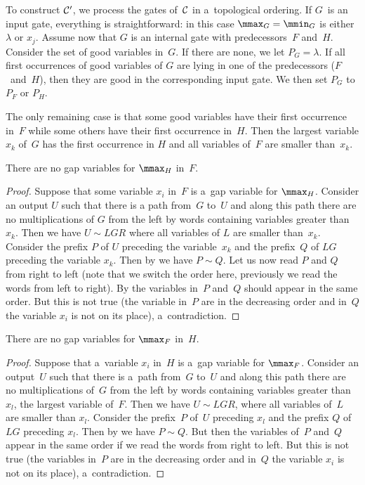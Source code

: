 To construct ${\cal C}'$, we process the gates of~${\cal C}$ in a~topological ordering. If $G$~is an input gate, everything is straightforward: in this case $\mmax_G=\mmin_G$ is either $\lambda$ or $x_j$. Assume now that $G$ is an internal gate with predecessors~$F$ and~$H$.
Consider the set of good variables in~$G$. If there are none, we let $P_G=\lambda$. If all first occurrences of good variables of $G$ are lying in one of the predecessors ($F$~and~$H$), then they are good in the corresponding input gate. We then set $P_G$ to $P_F$ or $P_H$.

The only remaining case is that some good variables have their first occurrence in~$F$ while some others have their first occurrence in~$H$. Then the largest variable $x_k$ of~$G$ has the first occurrence in $H$ and all variables of~$F$ are smaller than~$x_k$.

\begin{claim} \label{cl: h is good}
    There are no gap variables for $\mmax_H$ in~$F$.
\end{claim}

\begin{proof}
    Suppose that some variable $x_i$ in~$F$ is a~gap variable for $\mmax_H$. Consider an output $U$ such that there is a path from~$G$ to~$U$ and along this path there are no multiplications of $G$ from the left by words containing variables greater than~$x_k$. Then we have $U \sim LGR$ where all variables of $L$ are smaller than~$x_k$. Consider the prefix $P$ of $U$ preceding the variable~$x_k$ and the prefix~$Q$ of $LG$ preceding the variable $x_k$.
    Then by  we have $P \sim Q$. Let us now read $P$ and $Q$ from right to left (note that we switch the order here, previously we read the words from left to right). By  the variables in~$P$ and~$Q$ should appear in the same order. But this is not true (the variable in~$P$ are in the decreasing order and in~$Q$ the variable $x_i$ is not on its place), a~contradiction.
\end{proof}

\begin{claim}\label{cl: f is good}
    There are no gap variables for $\mmax_F$ in~$H$.
\end{claim}

\begin{proof}
    Suppose that a~variable $x_i$ in~$H$ is a~gap variable for $\mmax_F$. Consider an output~$U$ such that there is a~path from~$G$ to~$U$ and along this path there are no multiplications of~$G$ from the left by words containing variables greater than $x_l$, the largest variable of~$F$. Then we have $U \sim LGR$, where all variables of~$L$ are smaller than $x_l$. Consider the prefix~$P$ of~$U$ preceding $x_l$ and the prefix $Q$ of $LG$ preceding $x_l$.
    Then by  we have $P \sim Q$. But then the variables of~$P$ and~$Q$ appear in the same order if we read the words from right to left. But this is not true (the variables in~$P$ are in the decreasing order and in~$Q$ the variable $x_i$ is not on its place), a~contradiction.
\end{proof}

